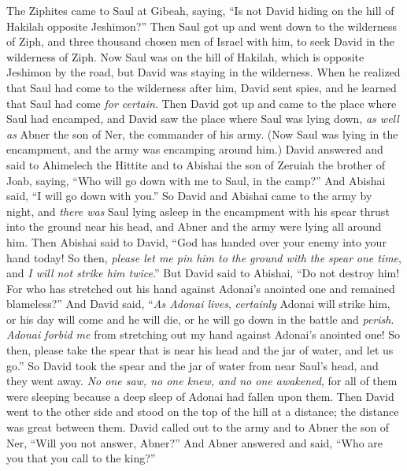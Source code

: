 \begin{biblechapter} %
 The Ziphites came to Saul at Gibeah, saying, “Is not David hiding on the hill of Hakilah opposite Jeshimon?”
\verse Then Saul got up and went down to the wilderness of Ziph, and three thousand chosen men of Israel with him, to seek David in the wilderness of Ziph.
\verse Now Saul was on the hill of Hakilah, which is opposite Jeshimon by the road, but David was staying in the wilderness. When he realized that Saul had come to the wilderness after him,
\verse David sent spies, and he learned that Saul had come \textit{for certain}.
\verse Then David got up and came to the place where Saul had encamped, and David saw the place where Saul was lying down, \textit{as well as} Abner the son of Ner, the commander of his army. (Now Saul was lying in the encampment, and the army was encamping around him.)
\verse David answered and said to Ahimelech the Hittite and to Abishai the son of Zeruiah the brother of Joab, saying, “Who will go down with me to Saul, in the camp?” And Abishai said, “I will go down with you.”
\verse So David and Abishai came to the army by night, and \textit{there was} Saul lying asleep in the encampment with his spear thrust into the ground near his head, and Abner and the army were lying all around him.
\verse Then Abishai said to David, “God has handed over your enemy into your hand today! So then, \textit{please let me pin him to the ground with the spear} \textit{one time}, and \textit{I will not strike him twice}.”
\verse But David said to Abishai, “Do not destroy him! For who has stretched out his hand against Adonai’s anointed one and remained blameless?”
\verse And David said, “\textit{As Adonai lives}, \textit{certainly} Adonai will strike him, or his day will come and he will die, or he will go down in the battle and \textit{perish}.
\verse \textit{Adonai forbid me} from stretching out my hand against Adonai’s anointed one! So then, please take the spear that is near his head and the jar of water, and let us go.”
\verse So David took the spear and the jar of water from near Saul’s head, and they went away. \textit{No one saw, no one knew, and no one awakened}, for all of them were sleeping because a deep sleep of Adonai had fallen upon them.
\verse Then David went to the other side and stood on the top of the hill at a distance; the distance was great between them.
\verse David called out to the army and to Abner the son of Ner, “Will you not answer, Abner?” And Abner answered and said, “Who are you that you call to the king?”

\end{biblechapter}
